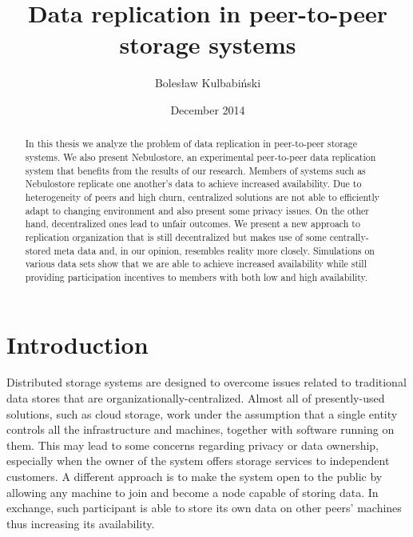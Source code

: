 \documentclass{pracamgren}
\author{Bolesław Kulbabiński}
\title{Data replication in peer-to-peer storage systems}
\date{December 2014}
\begin{document}
 \maketitle

\begin{abstract} 
In this thesis we analyze the problem of data replication in peer-to-peer storage systems.
We also present Nebulostore, an experimental peer-to-peer data replication system that benefits from the results of our research.
Members of systems such as Nebulostore replicate one another's data to achieve increased availability. Due to heterogeneity of peers and high churn, centralized solutions are not able to efficiently adapt to changing environment and also present some privacy issues. On the other hand, decentralized ones lead to unfair outcomes. We present a new approach to replication organization that is still decentralized but makes use of some centrally-stored meta data and, in our opinion, resembles reality more closely. Simulations on various data sets show that we are able to achieve increased availability while still providing participation incentives to members with both low and high availability.
\end{abstract}


\tableofcontents


\chapter*{Introduction}\label{chap::introduction}

Distributed storage systems are designed to overcome issues related to traditional data stores that are organizationally-centralized.
Almost all of presently-used solutions, such as cloud storage, work under the assumption that a single entity controls all the infrastructure and machines, together with software running on them. This may lead to some concerns regarding privacy or data ownership, especially when the owner of the system offers storage services to independent customers.
A different approach is to make the system open to the public by allowing any machine to join and become a node capable of storing data. In exchange, such participant is able to store its own data on other peers' machines thus increasing its availability.\\
\end{document}
